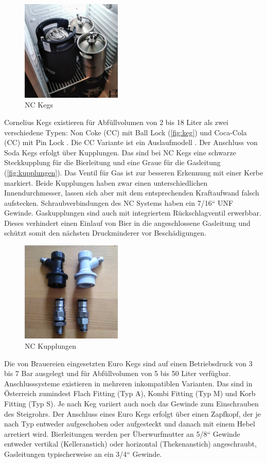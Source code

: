 \documentclass[a4paper,parskip=half]{scrartcl}
\begin{document}
\begin{figure}[h]
\centering
\includegraphics[width=4.8cm]{images/keg.jpg}
\caption{NC Kegs}
\label{fig:keg}
\end{figure}

Cornelius Kegs existieren für Abfüllvolumen von 2 bis 18 Liter als zwei verschiedene Typen: Non Coke (CC) mit Ball Lock (\autoref{fig:keg}) und Coca-Cola (CC) mit Pin Lock \autocite{Westemeier1995}. Die CC Variante ist ein Auslaufmodell \autocite{Gretzschel2016}. Der Anschluss von Soda Kegs erfolgt über Kupplungen. Das sind bei NC Kegs eine schwarze Steckkupplung für die Bierleitung und eine Graue für die Gasleitung (\autoref{fig:kupplungen}). Das Ventil für Gas ist zur besseren Erkennung mit einer Kerbe markiert. Beide Kupplungen haben zwar einen unterschiedlichen Innendurchmesser, lassen sich aber mit dem entsprechenden Kraftaufwand falsch aufstecken. Schraubverbindungen des NC Systems haben ein 7/16“ UNF Gewinde. Gaskupplungen sind auch mit integriertem Rückschlagventil erwerbbar. Dieses verhindert einen Einlauf von Bier in die angeschlossene Gasleitung und schützt somit den nächsten Druckminderer vor Beschädigungen.

\begin{figure}[h]
\centering
\includegraphics[width=4.8cm]{images/kupplungen.jpg}
\caption{NC Kupplungen}
\label{fig:kupplungen}
\end{figure}

Die von Brauereien eingesetzten Euro Kegs sind auf einen Betriebsdruck von 3 bis 7 Bar ausgelegt und für Abfüllvolumen von 5 bis 50 Liter verfügbar. Anschlusssysteme existieren in mehreren inkompatiblen Varianten. Das sind in Österreich zumindest Flach Fitting (Typ A), Kombi Fitting (Typ M) und Korb Fitting (Typ S). Je nach Keg variiert auch noch das Gewinde zum Einschrauben des Steigrohrs. \autocite{HWBS2021a} Der Anschluss eines Euro Kegs erfolgt über einen Zapfkopf, der je nach Typ entweder aufgeschoben oder aufgesteckt und danach mit einem Hebel arretiert wird. Bierleitungen werden per Überwurfmutter an 5/8“ Gewinde entweder vertikal (Kelleranstich) oder horizontal (Thekenanstich) angeschraubt, Gasleitungen typischerweise an ein 3/4“ Gewinde.
\end{document}
